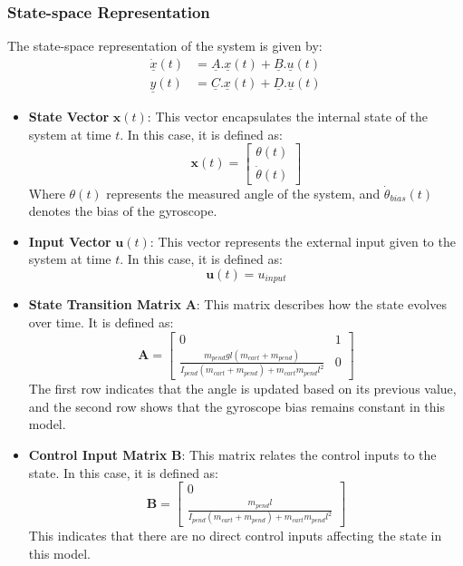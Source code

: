 \subsubsection{State-space Representation}
The state-space representation of the system is given by:
\begin{equation}
\begin{aligned}
	\underline{\dot{x}}(t) &= \underline{A}.\underline{x}(t) + \underline{B}.\underline{u}(t) \\
	\underline{y}(t) &= \underline{C}.\underline{x}(t) + \underline{D}.\underline{u}(t) \label{eq:state_space_eq}
\end{aligned}
\end{equation}
\begin{itemize}
	\item \textbf{State Vector} $\mathbf{x}(t)$: This vector encapsulates the internal state of the system at time $t$. In this case, it is defined as: 
	\begin{equation}
		\mathbf{x}(t) = \begin{bmatrix} \theta(t) \\ \dot{\theta}(t) \end{bmatrix}
	\end{equation}
	Where $\theta(t)$ represents the measured angle of the system, and $\dot{\theta}_{bias}(t)$ denotes the bias of the gyroscope.
	
	\item \textbf{Input Vector} $\mathbf{u}(t)$: This vector represents the external input given to the system at time $t$. In this case, it is defined as:
	\begin{equation}
		\mathbf{u}(t) = u_{input} 
	\end{equation}
	\item \textbf{State Transition Matrix} $\mathbf{A}$: This matrix describes how the state evolves over time. It is defined as:
\begin{equation}
	\mathbf{A} = \begin{bmatrix}
		0 & 1 \\
		\frac{m_{pend} g l (m_{cart} + m_{pend})}{I_{pend} (m_{cart} + m_{pend}) + m_{cart} m_{pend} l^2} & 0
	\end{bmatrix} \label{eq:state_transition_matrix}
\end{equation}
	The first row indicates that the angle is updated based on its previous value, and the second row shows that the gyroscope bias remains constant in this model.

	\item \textbf{Control Input Matrix} $\mathbf{B}$: This matrix relates the control inputs to the state. In this case, it is defined as:
\begin{equation}
	\mathbf{B} =  \begin{bmatrix}
		0 \\
		\frac{m_{pend} l}{I_{pend} (m_{cart} + m_{pend}) + m_{cart} m_{pend} l^2}
	\end{bmatrix} \label{eq:control_input_matrix}
\end{equation}
	This indicates that there are no direct control inputs affecting the state in this model.
	

\end{itemize}
